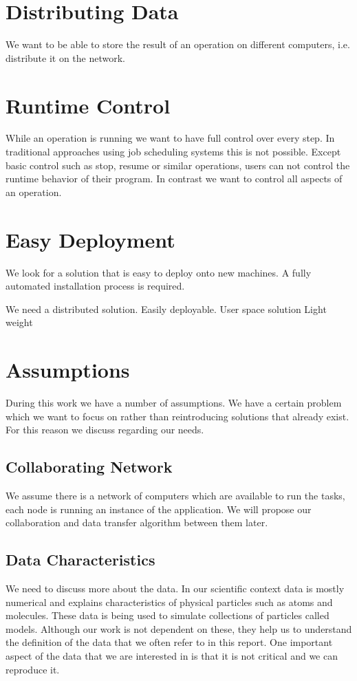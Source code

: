 \section{Distributing Data}
We want to be able to store the result of an operation on different computers, i.e. distribute it on the network.

\section{Runtime Control}
While an operation is running we want to have full control over every step. In traditional approaches using job
scheduling systems this is not possible. Except basic control such as stop, resume or similar operations, users
can not control the runtime behavior of their program. In contrast we want to control all aspects of an operation.

\section{Easy Deployment}
We look for a solution that is easy to deploy onto new machines. A fully automated installation process
is required.

We need a distributed solution.
Easily deployable.
User space solution
Light weight



\section{Assumptions}
During this work we have a number of assumptions. We have a certain problem which we want to focus
on rather than reintroducing solutions that already exist. For this reason we discuss regarding our 
needs.

\subsection{Collaborating Network}
We assume there is a network of computers which are available to run the tasks, each node is running an instance
of the application. We will propose our collaboration and data transfer algorithm between them later.

\subsection{Data Characteristics}
We need to discuss more about the data. In our scientific context data is mostly numerical and explains characteristics
of physical particles such as atoms and molecules. These data is being used to simulate collections of particles called
models. Although our work is not dependent on these, they help us to understand the definition of the data that
we often refer to in this report. One important aspect of the data that we are interested in is that it is not critical 
and we can reproduce it. 

